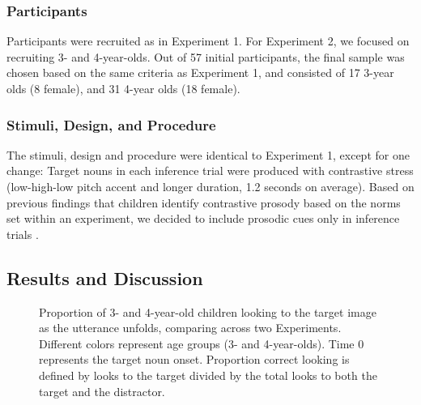 \documentclass[10pt,letterpaper]{article}
\begin{document}
\subsubsection{Participants}

Participants were recruited as in Experiment 1. For Experiment 2, we focused on recruiting 3- and 4-year-olds. Out of 57 initial participants, the final sample was chosen based on the same criteria as Experiment 1, and consisted of 17 3-year olds (8 female), and 31 4-year olds (18 female).

\subsubsection{Stimuli, Design, and Procedure}

The stimuli, design and procedure were identical to Experiment 1, except for one change: Target nouns in each inference trial were produced with contrastive stress (low-high-low pitch accent and longer duration, 1.2 seconds on average). Based on previous findings that children identify contrastive prosody based on the norms set within an experiment, we decided to include prosodic cues only in inference trials \cite{kurumada1contextual}. 

\subsection{Results and Discussion}

\begin{figure}[t]
	\caption{\label{fig:pros0} Proportion of 3- and 4-year-old children looking to the target image as the utterance unfolds, comparing across two Experiments. Different colors represent age groups (3- and 4-year-olds). Time 0 represents the target noun onset. Proportion correct looking is defined by looks to the target divided by the total looks to both the target and the distractor.}
\end{figure}
\end{document}
